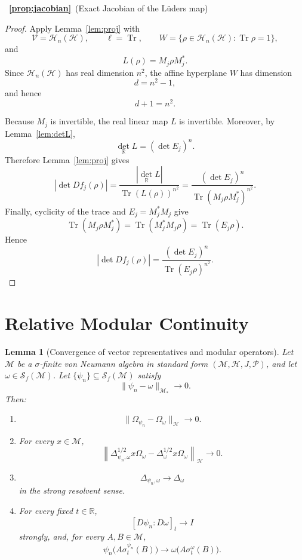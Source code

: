 \documentclass[11pt]{article}
\newtheorem{lemma}[theorem]{Lemma}
\newcommand{\Tr}{\operatorname{Tr}}
\newcommand{\Herm}{\mathcal{H}_{n}}
\begin{document}
~{\bf \ref{prop:jacobian}}~(Exact Jacobian of the L\"uders map)
\begin{proof}
Apply Lemma~\ref{lem:proj} with
\[
\mathcal V=\Herm(\mathcal H),
\qquad
\ell=\Tr,
\qquad
W=\{\rho\in\Herm(\mathcal H):\Tr\rho=1\},
\]
and
\[
L(\rho)=M_j\rho M_j^*.
\]
Since \(\Herm(\mathcal H)\) has real dimension \(n^2\), the affine
hyperplane \(W\) has dimension
\[
d=n^2-1,
\]
and hence
\[
d+1=n^2.
\]

Because \(M_j\) is invertible, the real linear map \(L\) is invertible.
Moreover, by Lemma~\ref{lem:detL},
\[
\det_{\mathbb R}L=(\det E_j)^n.
\]
Therefore Lemma~\ref{lem:proj} gives
\[
\left|\det Df_j(\rho)\right|
=
\frac{|\det_{\mathbb R}L|}
{\Tr(L(\rho))^{n^2}}
=
\frac{(\det E_j)^n}
{\Tr(M_j\rho M_j^*)^{n^2}}.
\]
Finally, cyclicity of the trace and \(E_j=M_j^*M_j\) give
\[
\Tr(M_j\rho M_j^*)
=
\Tr(M_j^*M_j\rho)
=
\Tr(E_j\rho).
\]
Hence
\[
\left|\det Df_j(\rho)\right|
=
\frac{(\det E_j)^n}
{\Tr(E_j\rho)^{n^2}}.
\]
\end{proof}

\section{Relative Modular Continuity}
\label{sec:kms-continuity-proof}
\begin{lemma}[Convergence of vector representatives and modular operators]
\label{lem:cocycle_strong}
Let $\mathcal M$ be a $\sigma$-finite von Neumann algebra in standard
form $(\mathcal M,\mathcal H,J,\mathcal P)$, and let
$\omega\in\mathcal S_f(\mathcal M)$. Let
$\{\psi_n\}\subseteq\mathcal S_f(\mathcal M)$ satisfy
\[
\|\psi_n-\omega\|_{\mathcal M_*}\longrightarrow0.
\]
Then:
\begin{enumerate}
\item[\rm(i)]
\[
\|\Omega_{\psi_n}-\Omega_\omega\|_{\mathcal H}
\longrightarrow0.
\]

\item[\rm(ii)]
For every $x\in\mathcal M$,
\[
\left\|
\Delta_{\psi_n,\omega}^{1/2}x\Omega_\omega
-
\Delta_\omega^{1/2}x\Omega_\omega
\right\|_{\mathcal H}
\longrightarrow0.
\]

\item[\rm(iii)]
\[
\Delta_{\psi_n,\omega}
\longrightarrow
\Delta_\omega
\]
in the strong resolvent sense.

\item[\rm(iv)]
For every fixed $t\in\mathbb R$,
\[
[D\psi_n:D\omega]_t
\longrightarrow I
\]
strongly, and, for every $A,B\in\mathcal M$,
\[
\psi_n\bigl(A\sigma_t^{\psi_n}(B)\bigr)
\longrightarrow
\omega\bigl(A\sigma_t^\omega(B)\bigr).
\]

\end{enumerate}
\end{lemma}
\end{document}
